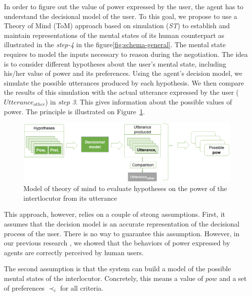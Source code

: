 \documentclass[conference, letterpaper]{IEEEtran}
\begin{document}
	In order to figure out the value of power expressed by the user, the agent has to understand the decisional model of the user. To this goal, we propose to use a Theory of Mind (ToM) approach \cite{premack1978does} based on simulation (\emph{ST}) to establish and maintain representations of the mental states of its human counterpart as illustrated in the \emph{step-4} in the figure\ref{fig:schema-general}. 
	The mental state requires to model the inputs necessary to reason during the negotiation. The idea is to consider different hypotheses about the user's mental state, including his/her value of power and its preferences. Using the agent's decision model, we simulate the possible utterances produced by each hypothesis. 
	We then compare the results of this simulation with the actual utterance expressed by the user ($Utterance_{other}$) in \textit{step 3}. This gives information about the possible values of power. The principle is illustrated on Figure~\ref{fig:tom}.
	
	\begin{figure}
		\centering
		\includegraphics[width=0.8\linewidth]{figs/model/tom_select.png}
		\caption{Model of theory of mind to evaluate hypotheses on the power of the intertlocutor from its utterance} 
		\label{fig:tom}
	\end{figure} 
	
	This approach, however, relies on a couple of strong assumptions. First, it assumes that the decision model is an accurate representation of the decisional process of the user. There is no way to guarantee this assumption. However, in our previous research \cite{ouali2017computational}, we showed that the behaviors of power expressed by agents are correctly perceived by human users. 
	
	The second assumption is that the system can build a model of the possible mental states of the interlocutor. Concretely, this means a value of $pow$ and a set of preferences $\prec_i$ for all criteria. 
	
\end{document}
